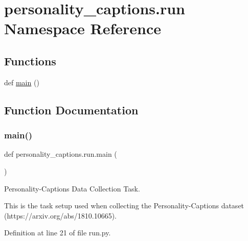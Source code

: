 \hypertarget{namespacepersonality__captions_1_1run}{}\section{personality\+\_\+captions.\+run Namespace Reference}
\label{namespacepersonality__captions_1_1run}
\subsection*{Functions}
\begin{DoxyCompactItemize}
\item 
def \hyperlink{namespacepersonality__captions_1_1run_a6cc04d2f2bf859221adef60a6ea0857f}{main} ()
\end{DoxyCompactItemize}


\subsection{Function Documentation}
\mbox{\label{namespacepersonality__captions_1_1run_a6cc04d2f2bf859221adef60a6ea0857f}} 
\subsubsection{\texorpdfstring{main()}{main()}}
{\footnotesize\ttfamily def personality\+\_\+captions.\+run.\+main (\begin{DoxyParamCaption}{ }\end{DoxyParamCaption})}

\begin{DoxyVerb}Personality-Captions Data Collection Task.

This is the task setup used when collecting the Personality-Captions dataset
(https://arxiv.org/abs/1810.10665).
\end{DoxyVerb}
 

Definition at line 21 of file run.\+py.


